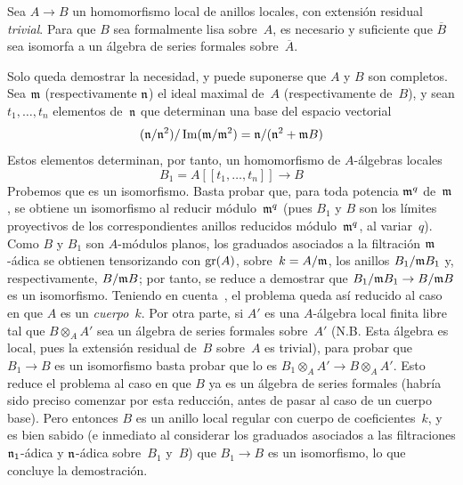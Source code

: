 
\begin{proposition}
\label{III.1.5}
Sea $A\to B$ un homomorfismo local de anillos locales, con extensión residual \emph{trivial}. Para que $B$ sea formalmente lisa sobre~$A$, es necesario y suficiente que $\overline{B}$ sea isomorfa a un álgebra de series formales sobre~$\overline{A}$.
\end{proposition}

Solo queda demostrar la necesidad, y puede suponerse que $A$ y $B$ son completos. Sea $\mathfrak{m}$ (respectivamente $\mathfrak{n}$) el ideal maximal de~$A$ (respectivamente de~$B$), y sean $t_1,\dots,t_n$ elementos de~$\mathfrak{n}$ que determinan una base del espacio vectorial
$$
(\mathfrak{n}/\mathfrak{n}^2)/\operatorname{Im}(\mathfrak{m}/\mathfrak{m}^2)=
\mathfrak{n}/(\mathfrak{n}^2+\mathfrak{m}B)
$$
Estos elementos determinan, por tanto, un homomorfismo de $A$-álgebras locales
$$
B_1=A[[t_1,\dots,t_n]]\to B
$$
Probemos
que es un isomorfismo. Basta probar que, para toda potencia $\mathfrak{m}^q$ de~$\mathfrak{m}$, se obtiene un isomorfismo al reducir módulo~$\mathfrak{m}^q$ (pues $B_1$ y $B$ son los límites proyectivos de los correspondientes anillos reducidos módulo~$\mathfrak{m}^q$, al variar~$q$). Como $B$ y $B_1$ son $A$-módulos planos, los graduados asociados a la filtración $\mathfrak{m}$-ádica se obtienen tensorizando con $\operatorname{gr}(A)$, sobre~$k=A/\mathfrak{m}$, los anillos $B_1/\mathfrak{m}B_1$ y, respectivamente, $B/\mathfrak{m}B$; por tanto, se reduce a demostrar que $B_1/\mathfrak{m}B_1\to B/\mathfrak{m}B$ es un isomorfismo. Teniendo en cuenta~, el problema queda así reducido al caso en que $A$ es un \emph{cuerpo}~$k$. Por otra parte, si $A'$ es una $A$-álgebra local finita libre tal que $B\otimes_A A'$ sea un álgebra de series formales sobre~$A'$ (N.B. Esta álgebra es local, pues la extensión residual de~$B$ sobre~$A$ es trivial), para probar que $B_1\to B$ es un isomorfismo basta probar que lo es $B_1\otimes_A A'\to B\otimes_A A'$. Esto reduce el problema al caso en que $B$ ya es un álgebra de series formales (habría sido preciso comenzar por esta reducción, antes de pasar al caso de un cuerpo base). Pero entonces $B$ es un anillo local regular con cuerpo de coeficientes~$k$, y es bien sabido (e inmediato al considerar los graduados asociados a las filtraciones $\mathfrak{n}_1$-ádica y $\mathfrak{n}$-ádica sobre~$B_1$ y~$B$) que $B_1\to B$ es un isomorfismo, lo que concluye la demostración.


